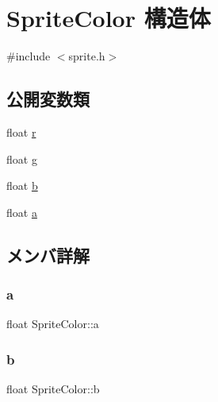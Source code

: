 \hypertarget{struct_sprite_color}{}\section{Sprite\+Color 構造体}
\label{struct_sprite_color}


{\ttfamily \#include $<$sprite.\+h$>$}

\subsection*{公開変数類}
\begin{DoxyCompactItemize}
\item 
float \mbox{\hyperlink{struct_sprite_color_a640d8864838a78db2a9d5f1840e24882}{r}}
\item 
float \mbox{\hyperlink{struct_sprite_color_ae59c4c99310c60ac72740f83a3073a44}{g}}
\item 
float \mbox{\hyperlink{struct_sprite_color_ae99d1e9c97a11bd8c3db47a0ee9d45c1}{b}}
\item 
float \mbox{\hyperlink{struct_sprite_color_a82a19f7f0f96f706b9c4715eb87e0de8}{a}}
\end{DoxyCompactItemize}


\subsection{メンバ詳解}
\mbox{\label{struct_sprite_color_a82a19f7f0f96f706b9c4715eb87e0de8}} 
\subsubsection{\texorpdfstring{a}{a}}
{\footnotesize\ttfamily float Sprite\+Color\+::a}

\mbox{\label{struct_sprite_color_ae99d1e9c97a11bd8c3db47a0ee9d45c1}} 
\subsubsection{\texorpdfstring{b}{b}}
{\footnotesize\ttfamily float Sprite\+Color\+::b}

\mbox{\label{struct_sprite_color_ae59c4c99310c60ac72740f83a3073a44}} 
